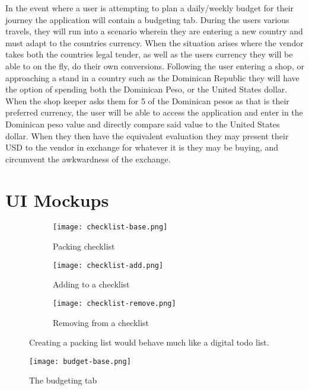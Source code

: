 \documentclass[12pt]{article}
\begin{document}
	In the event where a user is attempting to plan a daily/weekly budget for their journey the application will contain a budgeting tab.
	During the users various travels, they will run into a scenario wherein they are
	entering a new country and must adapt to the countries currency.
	When the situation arises where the vendor takes both the countries legal tender,
	as well as the users currency they will be able to on the fly, do their own conversions.
	Following the user entering a shop, or approaching a stand in a country such as the Dominican Republic
	they will have the option of spending both the Dominican	Peso, or the United States dollar.
	When the shop keeper asks them for 5 of the Dominican pesos as that is their preferred currency,
	the user will be able to access the application and enter in the Dominican peso value and directly compare said value to the United States dollar.
	When they then have the equivalent evaluation they may present their USD to the vendor in exchange for whatever it is they may be buying,
	and circumvent the awkwardness of the exchange.

\pagebreak

\section*{UI Mockups}

\begin{figure}[h!]
	\centering
	\begin{subfigure}[h!]{0.2\linewidth}
		\texttt{[image: checklist-base.png]}
		\caption{Packing checklist}
		\label{fig:checklist-base}
	\end{subfigure}
	\begin{subfigure}[h]{0.2\linewidth}
		\texttt{[image: checklist-add.png]}
		\caption{Adding to a checklist}
		\label{fig:checklist-add}
	\end{subfigure}
	\begin{subfigure}[h]{0.2\linewidth}
		\texttt{[image: checklist-remove.png]}
		\caption{Removing from a checklist}
		\label{fig:checklist-remove}
	\end{subfigure}
	\caption{Creating a packing list would behave much like a digital todo list.}
\end{figure}

\begin{figure}[ht!]
	\texttt{[image: budget-base.png]}
	\caption{The budgeting tab}
	\label{fig:budget-base}
\end{figure}
\end{document}
